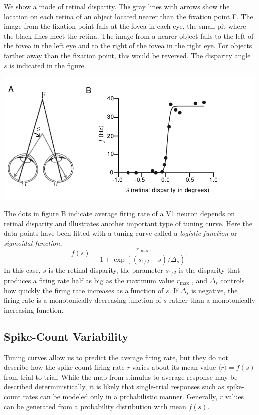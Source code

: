 \begin{exm}
  \label{fig:1.7}
  We show a mode of retinal disparity. The gray lines with arrows show the
location on each retina of an object located nearer than the fixation point F. The
image from the fixation point falls at the fovea in each eye, the small pit where
the black lines meet the retina. The image from a nearer object falls to the left of
the fovea in the left eye and to the right of the fovea in the right eye. For objects
farther away than the fixation point, this would be reversed. The disparity angle $s$
is indicated in the figure.
\begin{center}
  \includegraphics[scale=0.3]{./png/fig_1_7.png}
\end{center}
The dots in figure B indicate average firing rate of a V1 neuron depends on
retinal disparity and illustrates another important type of tuning curve.
Here the data points have been fitted with a tuning curve called
a \emph{logistic function} or \emph{sigmoidal function},
\begin{equation}
  \label{equ:1.17}
  f(s)=\frac{r_{\text{max}}}{1+\exp\left(\left(s_{1/2}-s\right)/\Delta_s\right)}.
\end{equation}
In this case, $s$ is the retinal disparity, the parameter $s_{1/2}$ is the disparity
that produces a firing rate half as big as the maximum value $r_{\text{max}}$ , and $\Delta_s$
controls how quickly the firing rate increases as a function of $s$. If $\Delta_s$ is
negative, the firing rate is a monotonically decreasing function of $s$ rather
than a monotonically increasing function.
\end{exm}

\subsection{Spike-Count Variability}
\begin{rem}
  Tuning curves allow us to predict the average firing rate, but they do not
describe how the spike-count firing rate $r$ varies about its mean value $\langle r\rangle=f(s) $ 
from trial to trial. While the map from stimulus to average
response may be described deterministically, it is likely that single-trial
responses such as spike-count rates can be modeled only in a probabilistic manner.
Generally, $r$ values can be generated from a probability
distribution with mean $f(s)$.
\end{rem}

